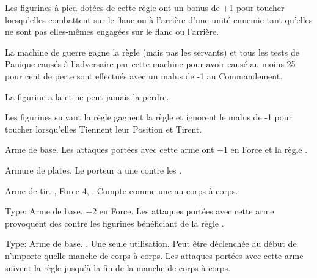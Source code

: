 \armyspecialruleentry{\opportunist{}}

Les figurines à pied dotées de cette règle ont un bonus de +1 pour toucher lorsqu'elles combattent sur le flanc ou à l'arrière d'une unité ennemie tant qu'elles ne sont pas elles-mêmes engagées sur le flanc ou l'arrière.

\armyspecialruleentry{\daemonicinfusion{}}

La machine de guerre gagne la règle \magicalattacks{} (mais pas les servants) et tous les tests de Panique causés à l'adversaire par cette machine pour avoir causé au moins 25 pour cent de perte sont effectués avec un malus de -1 au Commandement.

\armyspecialruleentry{\daemonicpossession}

La figurine a la \frenzy{} et ne peut jamais la perdre.

\armyspecialruleentry{\sturdy{}}

Les figurines suivant la règle \sturdy{} gagnent la règle \thunderouscharge{} et ignorent le malus de -1 pour toucher lorsqu'elles Tiennent leur Position et Tirent.

\closearmyspecialrules



\vspace*{1.5cm}
\startarmyarmoury

\startitemlistonecol

\listitemonecol{\infernalweapon{}} Arme de base. Les attaques portées avec cette arme ont +1 en Force et la règle \magicalattacks{}.

\listitemonecol{\infernalarmour{}}  Armure de plates. Le porteur a une  contre les \flamingattacks{}.

\listitemonecol{\flintlockaxe{}}  Arme de tir. , Force 4, . Compte comme une \halberd{} au corps à corps.


\enditemlistonecol

\closearmyarmoury

\startarmymagicalitems

\armymagicalweapons

\startpricelist

Type: Arme de base. +2 en Force. Les attaques portées avec cette arme provoquent des  contre les figurines bénéficiant de la règle \flammable{}.

Type: Arme de base. . Une seule utilisation. Peut être déclenchée au début de n'importe quelle manche de corps à corps. Les attaques portées avec cette arme suivent la règle \metalshifting{} jusqu'à la fin de la manche de corps à corps.


